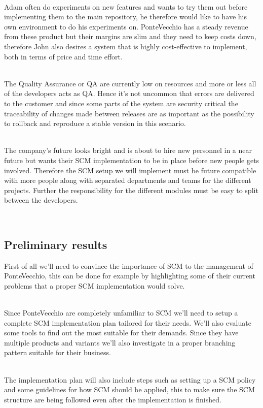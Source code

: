 \documentclass{article}
\begin{document}
\mbox{} \\
Adam often do experiments on new features and wants to try them out before implementing them to the main repository, he therefore would like to have his own environment to do his experiments on. PonteVecchio has a steady revenue from these product but their margins are slim and they need to keep costs down, therefore John also desires a system that is highly cost-effective to implement, both in terms of price and time effort. 

\mbox{} \\
The Quality Assurance or QA are currently low on resources and more or less all of the developers acts as QA. Hence it’s not uncommon that errors are delivered to the customer and since some parts of the system are security critical the traceability of changes made between releases are as important as the possibility to rollback and reproduce a stable version in this scenario.

\mbox{} \\
The company's future looks bright and is about to hire new personnel in a near future but wants their SCM implementation to be in place before new people gets involved. Therefore the SCM setup we will implement must be future compatible with more people along with separated departments and teams for the different projects. Further the responsibility for the different modules must be easy to split between the developers.

\mbox{} \\
\subsection{Preliminary results}
First of all we’ll need to convince the importance of SCM to the management of PonteVecchio, this can be done for example by highlighting some of their current problems that a proper SCM implementation would solve.

\mbox{} \\
Since PonteVecchio are completely unfamiliar to SCM we’ll need to setup a complete SCM implementation plan tailored for their needs. We’ll also evaluate some tools to find out the most suitable for their demands. 
Since they have multiple products and variants we’ll also investigate in a proper branching pattern suitable for their business.

\mbox{} \\
The implementation plan will also include steps such as setting up a SCM policy and some guidelines for how SCM should be applied, this to make sure the SCM structure are being followed even after the implementation is finished.
\end{document}
